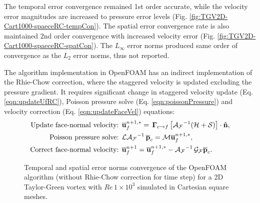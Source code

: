 The temporal error convergence remained 1st order accurate, while the velocity error magnitudes are increased to pressure error levels (Fig. \ref{fig:TGV2D-Cart1000-spaeceRC-tempCon}). The spatial error convergence rate is also maintained 2nd order convergence with increased velocity error (Fig. \ref{fig:TGV2D-Cart1000-spaeceRC-spatCon}). The $L_\infty$ error norms produced same order of convergence as the $L_2$ error norms, thus not reported.
%

The \piso algorithm implementation in OpenFOAM \cite{weller1998} has an indirect implementation of the Rhie-Chow correction, where the staggered velocity is updated excluding the pressure gradient. It requires significant change in staggered velocity update (Eq. \eqref{eqn:updateUfRC}), Poisson pressure solve (Eq. \eqref{eqn:poissonPressure}) and velocity correction (Eq. \eqref{eqn:updateFaceVel}) equations: 
\begin{align}
\begin{split}
\text{Update face-normal velocity: } & 
\overline{\mathbf{u}}_f^{n+1, *} = \, \mathbf{\Gamma}_{c \rightarrow f} \left[\mathcal{A_F}^{-1} ( \mathcal{H} + \mathcal{S}) \right] \cdot \mathbf{\hat{n}},
\\
\text{Poisson pressure solve: } & \mathcal{L} \mathcal{A_F}^{-1}  \, \overline{\mathbf{p}}_c = \mathcal{M} \overline{\mathbf{u}}_f^{n+1,*},
\\
\text{Correct face-normal velocity: } & \overline{\mathbf{u}}_f^{n+1} = \overline{\mathbf{u}}_f^{n+1, *} - \mathcal{A_F}^{-1} \, \mathcal{G_F}\overline{\mathbf{p}}_c .
\end{split}
\label{eqn:openfoamPiso}
\end{align}

\begin{figure}[!h]
\centering
{}
\caption{Temporal and spatial error norms convergence of the OpenFOAM \piso algorithm (without  Rhie-Chow correction for time step) for a 2D Taylor-Green vortex with $Re\,1\times10^3$ simulated in Cartesian square meshes.} 
\label{fig:TGV2D-Cart1000-piso}
\end{figure}

